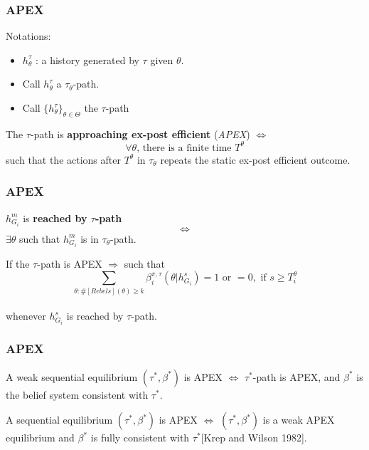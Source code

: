 \documentclass[9pt]{beamer}
\begin{document}
\begin{frame}
  \frametitle{APEX}
Notations:
\begin{itemize}
\item $h^{\tau}_{\theta}$ : a history generated by $\tau$ given $\theta$.
\item Call $h^{\tau}_{\theta}$ a $\tau_{\theta}$-path.
\item Call $\{h^{\tau}_{\theta}\}_{\theta\in \Theta}$ the $\tau$-path
\end{itemize}


\begin{definition}
The $\tau$-path is \textbf{approaching ex-post efficient} (\textit{APEX}) $\Leftrightarrow$ 
\[\text{$\forall\theta$,  there is a finite time $T^{\theta}$}\] 
such that the actions after $T^{\theta}$ in $\tau_{\theta}$ repeats the static ex-post efficient outcome.
\end{definition}
 


\end{frame}


\begin{frame}
  \frametitle{APEX}


\begin{definition}
$h^{m}_{G_i}$ is \textbf{reached by $\tau$-path} \[\Leftrightarrow\] $\exists \theta$ such that $h^{m}_{G_i}$ is in $\tau_{\theta}$-path.
\end{definition}
 
\begin{lemma}\label{lemma_learn}
If the $\tau$-path is APEX $\Rightarrow$
such that 
\[\sum_{\theta:\#[Rebels](\theta)\geq k}\beta^{\pi,\tau}_{i}(\theta|h^{s}_{G_i})=1 \text{ or } =0, \text{ if } s\geq T^{\theta}_i\]\\
whenever $h^{s}_{G_i}$ is reached by $\tau$-path.
\end{lemma}

\end{frame}


\begin{frame}
  \frametitle{APEX}


\begin{definition}
A weak sequential equilibrium $(\tau^{*},\beta^{*})$ is APEX $\Leftrightarrow$ $\tau^{*}$-path is APEX, and $\beta^{*}$ is the belief system consistent with $\tau^{*}$.
\end{definition}
\pause
\begin{definition}
A sequential equilibrium $(\tau^{*},\beta^{*})$ is APEX $\Leftrightarrow$ $(\tau^{*},\beta^{*})$ is a weak APEX equilibrium and $\beta^{*}$ is fully consistent with $\tau^{*}$[Krep and Wilson 1982].
\end{definition}

\end{frame}
\end{document}

